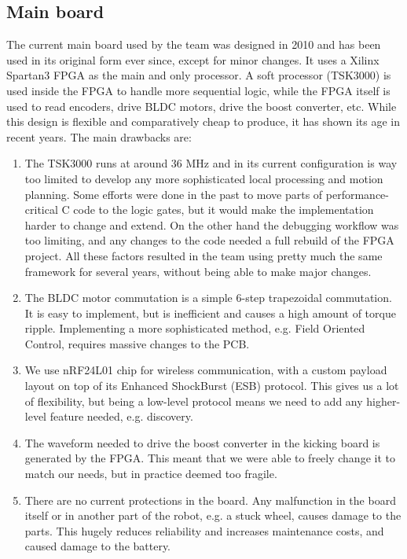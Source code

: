 \documentclass[runningheads]{llncs}
\begin{document}
\subsection{Main board}
The current main board used by the team was designed in 2010 and has been used in its original form ever since, except for minor changes. It uses a Xilinx Spartan3 FPGA as the main and only processor. A soft processor (TSK3000) is used inside the FPGA to handle more sequential logic, while the FPGA itself is used to read encoders, drive BLDC motors, drive the boost converter, etc.
While this design is flexible and comparatively cheap to produce, it has shown its age in recent years. The main drawbacks are:
\begin{enumerate}
    \item The TSK3000 runs at around 36 MHz and in its current configuration is way too limited to develop any more sophisticated local processing and motion planning. Some efforts were done in the past to move parts of performance-critical C code to the logic gates, but it would make the implementation harder to change and extend. On the other hand the debugging workflow was too limiting, and any changes to the code needed a full rebuild of the FPGA project. All these factors resulted in the team using pretty much the same framework for several years, without being able to make major changes.
    \item The BLDC motor commutation is a simple 6-step trapezoidal commutation. It is easy to implement, but is inefficient and causes a high amount of torque ripple. Implementing a more sophisticated method, e.g. Field Oriented Control, requires massive changes to the PCB.
    \item We use nRF24L01 chip for wireless communication, with a custom payload layout on top of its Enhanced ShockBurst (ESB) protocol. This gives us a lot of flexibility, but being a low-level protocol means we need to add any higher-level feature needed, e.g. discovery.
    \item The waveform needed to drive the boost converter in the kicking board is generated by the FPGA. This meant that we were able to freely change it to match our needs, but in practice deemed too fragile.
    \item There are no current protections in the board. Any malfunction in the board itself or in another part of the robot, e.g. a stuck wheel, causes damage to the parts. This hugely reduces reliability and increases maintenance costs, and caused damage to the battery.
\end{enumerate}
\end{document}

